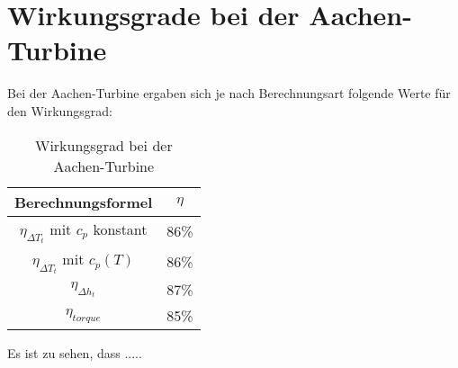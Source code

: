 \section{Wirkungsgrade bei der Aachen-Turbine}
\label{sec:wgaachen}
Bei der Aachen-Turbine ergaben sich je nach Berechnungsart folgende Werte für den Wirkungsgrad:
\begin{table}[H]
\centering
\caption{Wirkungsgrad bei der Aachen-Turbine}
\begin{tabular}{ c| c}
Berechnungsformel & $\eta$ \\
\hline
$\eta_{\Delta T_t}$ mit $c_p$ konstant& 86\% \\
$\eta_{\Delta T_t}$ mit $c_p(T)$& 86\% \\
$\eta_{\Delta h_t}$& 87\% \\
$\eta_{torque}$& 85\% \\
\end{tabular}
\label{tab:wgaachen}
\end{table}
Es ist zu sehen, dass .....







